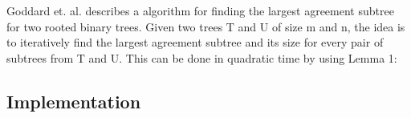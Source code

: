 \chapter{}
Goddard et. al. describes a  algorithm for finding the largest agreement subtree for two rooted binary trees. Given two trees T and U of size m and n, the idea is to iteratively find the largest agreement subtree and its size for every pair of subtrees from T and U. This can be done in quadratic time by using Lemma 1: \todo{\dots}

\section{Implementation}



\todo{\dots}
